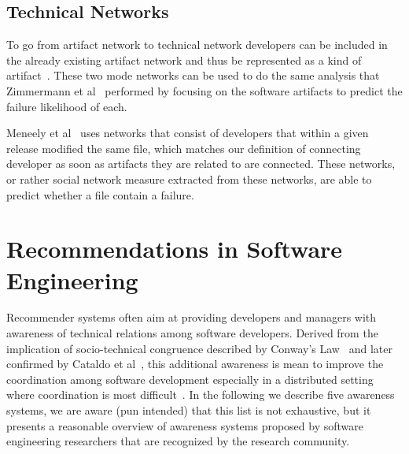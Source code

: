 \subsection{Technical Networks}
\label{chap:6:tn}
To go from artifact network to technical network developers can be included in the already existing artifact network and thus be represented as a kind of artifact~\cite{pinzger:fse:2008}.
These two mode networks can be used to do the same analysis that Zimmermann et al~\cite{zimmermann:esem:2009,zimmermann:icse:2008} performed by focusing on the software artifacts to predict the failure likelihood of each.

Meneely et al~\cite{meneely:fse:2008} uses networks that consist of developers that within a given release modified the same file, which matches our definition of connecting developer as soon as artifacts they are related to are connected.
These networks, or rather social network measure extracted from these networks, are able to predict whether a file contain a failure.









\section{Recommendations in Software Engineering}
%
%
%
Recommender systems often aim at providing developers and managers with awareness of technical relations among software developers.
Derived from the implication of socio-technical congruence described by Conway's Law~\cite{conway:datamination:1968} and later confirmed by Cataldo et al~\cite{cataldo:cscw:2006}, this additional awareness is mean to improve the coordination among software development especially in a distributed setting where coordination is most difficult~\cite{olson:hci:2000}.
In the following we describe five awareness systems, we are aware (pun intended) that this list is not exhaustive, but it presents a reasonable overview of awareness systems proposed by software engineering researchers that are recognized by the research community.

